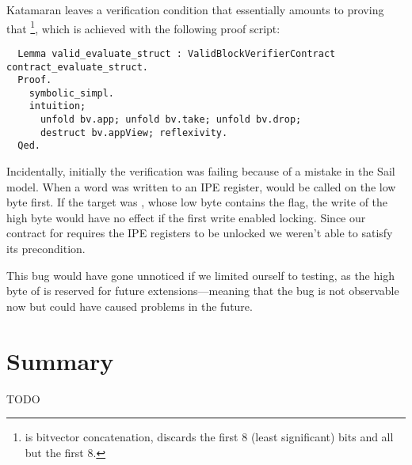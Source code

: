 Katamaran leaves a verification condition that essentially amounts to proving that \footnote{ is bitvector concatenation,  discards the first 8 (least significant) bits and  all but the first 8.}, which is achieved with the following proof script:

\begin{verbatim}
  Lemma valid_evaluate_struct : ValidBlockVerifierContract contract_evaluate_struct.
  Proof.
    symbolic_simpl.
    intuition;
      unfold bv.app; unfold bv.take; unfold bv.drop;
      destruct bv.appView; reflexivity.
  Qed.
\end{verbatim}

Incidentally, initially the verification was failing because of a mistake in the Sail model. When a word was written to an IPE register,  would be called on the low byte first. If the target was , whose low byte contains the  flag, the write of the high byte would have no effect if the first write enabled locking. Since our contract for  requires the IPE registers to be unlocked we weren't able to satisfy its precondition.

This bug would have gone unnoticed if we limited ourself to testing, as the high byte of  is reserved for future extensions---meaning that the bug is not observable now but could have caused problems in the future.

\section{Summary}
TODO
